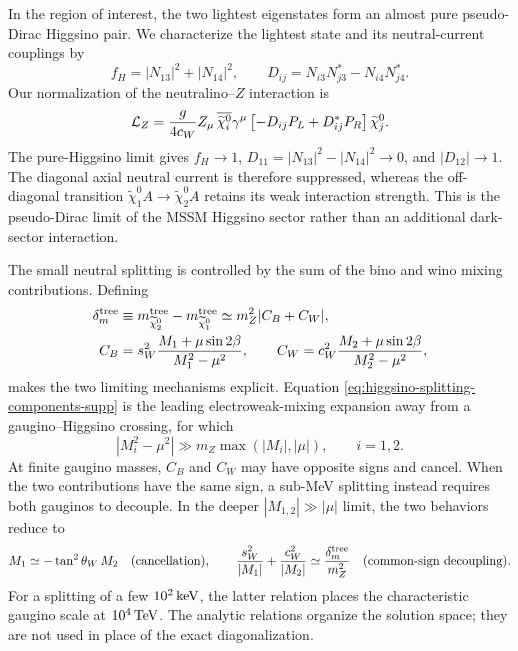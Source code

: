 \documentclass[%
  aps,
  prl,
  reprint,
  superscriptaddress,
  amsmath,
  amssymb,
  longbibliography
]{revtex4-2}
\begin{document}
In the region of interest, the two lightest eigenstates form an almost pure
pseudo-Dirac Higgsino pair.  We characterize the lightest state and its
neutral-current couplings by
\begin{equation}
 f_H=|N_{13}|^2+|N_{14}|^2,\qquad
 D_{ij}=N_{i3}N_{j3}^*-N_{i4}N_{j4}^* .
 \label{eq:higgsino-fraction-z-coupling-supp}
\end{equation}
Our normalization of the neutralino--\(Z\) interaction is
\begin{equation}
 {\cal L}_Z=
 \frac{g}{4c_W}Z_\mu\,
 \overline{\widetilde\chi_i^0}\gamma^\mu
 \left[-D_{ij}P_L+D_{ij}^*P_R\right]
 \widetilde\chi_j^0 .
 \label{eq:z-neutralino-vertex-supp}
\end{equation}
The pure-Higgsino limit gives \(f_H\to1\),
\(D_{11}=|N_{13}|^2-|N_{14}|^2\to0\), and
\(|D_{12}|\to1\).  The diagonal axial neutral current is therefore
suppressed, whereas the off-diagonal transition
\(\widetilde\chi_1^0 A\to\widetilde\chi_2^0 A\) retains its weak
interaction strength.  This is the pseudo-Dirac limit of the MSSM Higgsino
sector rather than an additional dark-sector interaction.

The small neutral splitting is controlled by the sum of the bino and wino
mixing contributions.  Defining
\begin{equation}
 \begin{split}
 \delta_m^{\rm tree}
 &\equiv
 m_{\widetilde\chi_2^0}^{\rm tree}
 -m_{\widetilde\chi_1^0}^{\rm tree}
 \simeq m_Z^2|C_B+C_W|,\\
 C_B&=s_W^2
 \frac{M_1+\mu\sin2\beta}{M_1^2-\mu^2},\qquad
 C_W=c_W^2
 \frac{M_2+\mu\sin2\beta}{M_2^2-\mu^2},
 \end{split}
 \label{eq:higgsino-splitting-components-supp}
\end{equation}
makes the two limiting mechanisms explicit.
Equation
\eqref{eq:higgsino-splitting-components-supp} is the leading
electroweak-mixing expansion away from a gaugino--Higgsino crossing, for
which
\begin{equation}
 |M_i^2-\mu^2|\gg
 m_Z\max\!\left(|M_i|,|\mu|\right),\qquad i=1,2 .
 \label{eq:heavy-gaugino-validity-supp}
\end{equation}
At finite gaugino masses, \(C_B\) and \(C_W\) may have opposite signs and
cancel.  When the two contributions have the same sign, a sub-MeV splitting
instead requires both gauginos to decouple.  In the deeper
\(|M_{1,2}|\gg|\mu|\) limit, the two behaviors reduce to
\begin{equation}
 M_1\simeq-\tan^2\theta_W\,M_2
 \quad\text{(cancellation)},\qquad
 \frac{s_W^2}{|M_1|}+\frac{c_W^2}{|M_2|}
 \simeq\frac{\delta_m^{\rm tree}}{m_Z^2}
 \quad\text{(common-sign decoupling)} .
 \label{eq:gaugino-limits-supp}
\end{equation}
For a splitting of a few \(10^2\,{\rm keV}\), the latter relation places
the characteristic gaugino scale at \(10^4\,{\rm TeV}\).  The analytic
relations organize the solution space; they are not used in place of the
exact diagonalization.
\end{document}
